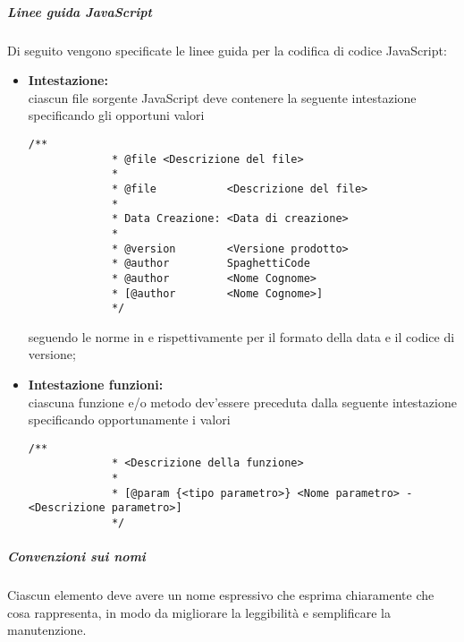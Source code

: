 \subparagraph{Linee guida JavaScript}
\label{par:convenzioni_javascript}

Di seguito vengono specificate le linee guida per la codifica di codice JavaScript:
\begin{itemize}
	\item \textbf{Intestazione:} \\
		ciascun file sorgente JavaScript deve contenere la seguente intestazione specificando gli opportuni valori
		\begin{lstlisting}[style=htmlcssjs]
			/**
	 	 	 * @file <Descrizione del file>
	 	 	 *
	 	 	 * @file           <Descrizione del file>
	 	 	 *
	 	 	 * Data Creazione: <Data di creazione>
	 	 	 *
	 	 	 * @version        <Versione prodotto>
	 	 	 * @author         SpaghettiCode
	 	 	 * @author         <Nome Cognome>
	 	 	 * [@author        <Nome Cognome>]
	 	 	 */
		\end{lstlisting}
		seguendo le norme in  e  rispettivamente per il formato della data e il codice di versione;
	\item \textbf{Intestazione funzioni:} \\
		ciascuna funzione e/o metodo dev'essere preceduta dalla seguente intestazione specificando opportunamente i valori
		\begin{lstlisting}[style=htmlcssjs]
			/**
			 * <Descrizione della funzione>
			 *
			 * [@param {<tipo parametro>} <Nome parametro> - <Descrizione parametro>]
			 */
		\end{lstlisting}
\end{itemize}

\subparagraph{Convenzioni sui nomi}

Ciascun elemento deve avere un nome espressivo che esprima chiaramente che cosa rappresenta, in modo da migliorare la leggibilità e
semplificare la manutenzione.


